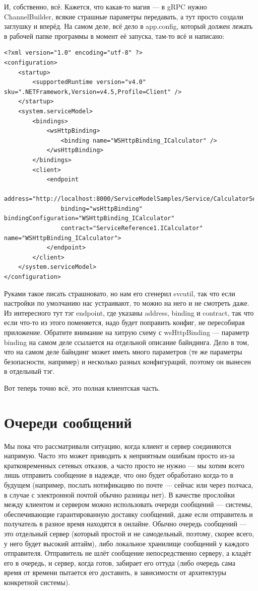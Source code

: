 \documentclass[a5paper]{article}
\begin{document}
И, собственно, всё. Кажется, что какая-то магия --- в gRPC нужно ChannelBuilder, всякие страшные параметры передавать, а тут просто создали заглушку и вперёд. На самом деле, всё дело в app.config, который должен лежать в рабочей папке программы в момент её запуска, там-то всё и написано: 

\begin{verbatim}
<?xml version="1.0" encoding="utf-8" ?>  
<configuration>  
    <startup>   
        <supportedRuntime version="v4.0" sku=".NETFramework,Version=v4.5,Profile=Client" />  
    </startup>  
    <system.serviceModel>  
        <bindings>  
            <wsHttpBinding>  
                <binding name="WSHttpBinding_ICalculator" />  
            </wsHttpBinding>  
        </bindings>  
        <client>  
            <endpoint 
                address="http://localhost:8000/ServiceModelSamples/Service/CalculatorService"  
                binding="wsHttpBinding" bindingConfiguration="WSHttpBinding_ICalculator"  
                contract="ServiceReference1.ICalculator" name="WSHttpBinding_ICalculator">  
            </endpoint>  
        </client>  
    </system.serviceModel>  
</configuration>
\end{verbatim}

Руками такое писать страшновато, но нам его сгенерил svcutil, так что если настройки по умолчанию нас устраивают, то можно на него и не смотреть даже. Из интересного тут тэг endpoint, где указаны address, binding и contract, так что если что-то из этого поменяется, надо будет поправить конфиг, не пересобирая приложение. Обратите внимание на хитрую схему с wsHttpBinding --- параметр binding на самом деле ссылается на отдельной описание байндинга. Дело в том, что на самом деле байндинг может иметь много параметров (те же параметры безопасности, например) и несколько разных конфигураций, поэтому он вынесен в отдельный тэг.

Вот теперь точно всё, это полная клиентская часть.

\section{Очереди сообщений}

Мы пока что рассматривали ситуацию, когда клиент и сервер соединяются напрямую. Часто это может приводить к неприятным ошибкам просто из-за кратковременных сетевых отказов, а часто просто не нужно --- мы хотим всего лишь отправить сообщение в надежде, что оно будет обработано когда-то в будущем (например, послать нотификацию по почте --- сейчас или через полчаса, в случае с электронной почтой обычно разницы нет). В качестве прослойки между клиентом и сервером можно использовать очереди сообщений --- системы, обеспечивающие гарантированную доставку сообщений, даже если отправитель и получатель в разное время находятся в онлайне. Обычно очередь сообщений --- это отдельный сервер (который простой и не самодельный, поэтому, скорее всего, у него будет высокий аптайм), либо локальное хранилище сообщений у каждого отправителя. Отправитель не шлёт сообщение непосредственно серверу, а кладёт его в очередь, и сервер, когда готов, забирает его оттуда (либо очередь сама время от времени пытается его доставить, в зависимости от архитектуры конкретной системы).
\end{document}
